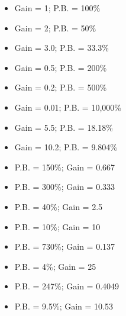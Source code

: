 
\begin{itemize}
\item{}Gain = 1; P.B. = 100\%
\vskip 5pt
\item{}Gain = 2; P.B. = 50\%
\vskip 5pt
\item{}Gain = 3.0; P.B. = 33.3\%
\vskip 5pt
\item{}Gain = 0.5; P.B. = 200\%
\vskip 5pt
\item{}Gain = 0.2; P.B. = 500\%
\vskip 5pt
\item{}Gain = 0.01; P.B. = 10,000\%
\vskip 5pt
\item{}Gain = 5.5; P.B. = 18.18\%
\vskip 5pt
\item{}Gain = 10.2; P.B. = 9.804\%
\end{itemize} 



\begin{itemize}
\item{}P.B. = 150\%; Gain = 0.667
\vskip 5pt
\item{}P.B. = 300\%; Gain = 0.333
\vskip 5pt
\item{}P.B. = 40\%; Gain = 2.5
\vskip 5pt
\item{}P.B. = 10\%; Gain = 10
\vskip 5pt
\item{}P.B. = 730\%; Gain = 0.137
\vskip 5pt
\item{}P.B. = 4\%; Gain = 25
\vskip 5pt
\item{}P.B. = 247\%; Gain = 0.4049
\vskip 5pt
\item{}P.B. = 9.5\%; Gain = 10.53
\end{itemize} 












